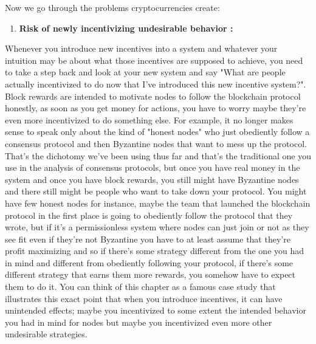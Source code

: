 Now we go through the problems cryptocurrencies create:\\
\begin{enumerate}
    \item \textbf{Risk of newly incentivizing undesirable behavior :}
\end{enumerate}
Whenever you introduce new incentives into a system and whatever your intuition may be about what those incentives are supposed to achieve, you need to take a step back and look at your new system and say "What are people actually incentivized to do now that I've introduced this new incentive system?". Block rewards are intended to motivate nodes to follow the blockchain protocol honestly, as soon as you get money for actions, you have to worry maybe they're even more incentivized to do something else. For example, it no longer makes sense to speak only about the kind of "honest nodes" who just obediently follow a consensus protocol and then Byzantine nodes that want to mess up the protocol. That's the dichotomy we've been using thus far and that's the traditional one you use in the analysis of consensus protocols, but once
you have real money in the system and once you have block
rewards, you still might have Byzantine nodes and there still might be people who want to take down your protocol. You might have few honest nodes for instance, maybe the team that launched the blockchain protocol in the first place is going to obediently follow the protocol that they wrote, but if it's a permissionless system where nodes can just join or not as they see fit even if they're not Byzantine you have to at least assume that they're profit maximizing and so if there's some strategy different from the one you had in mind and different from obediently following your protocol, if there's some different strategy that earns them more rewards, you somehow have to expect them to do it. You can think of this chapter as a famous case study that illustrates this exact point that when you introduce incentives, it can have unintended effects; maybe you incentivized to some extent the intended behavior you had in mind for nodes but maybe you incentivized even more other undesirable strategies.\\

\noindent

